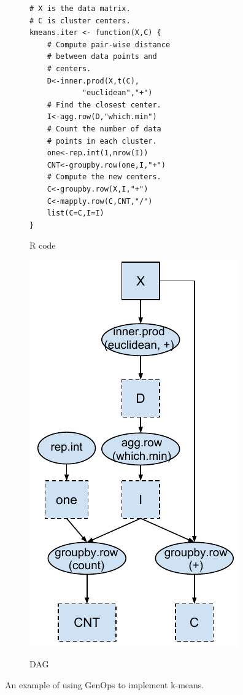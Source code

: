 \begin{figure}
\centering
	\footnotesize
	\begin{subfigure}{.25\textwidth}
	\centering
	\begin{verbatim}
# X is the data matrix.
# C is cluster centers.
kmeans.iter <- function(X,C) {
	# Compute pair-wise distance
	# between data points and
	# centers.
	D<-inner.prod(X,t(C),
			"euclidean","+")
	# Find the closest center.
	I<-agg.row(D,"which.min")
	# Count the number of data
	# points in each cluster.
	one<-rep.int(1,nrow(I))
	CNT<-groupby.row(one,I,"+")
	# Compute the new centers.
	C<-groupby.row(X,I,"+")
	C<-mapply.row(C,CNT,"/")
	list(C=C,I=I)
}
	\end{verbatim}
	\label{fig:code}
		\caption{R code }
	\hspace{20pt}
	\end{subfigure}%
	\begin{subfigure}{.25\textwidth}
	\centering
	\includegraphics[scale=0.5]{FlashMatrix_figs/DAG.pdf}
	\label{fig:dag}
	\caption{DAG}
	\end{subfigure}
	\caption{An example of using GenOps to implement k-means.}
	\label{fig:kmeans}
\end{figure}

